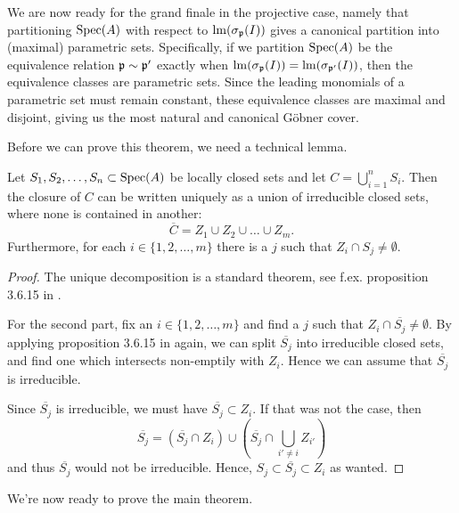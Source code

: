 We are now ready for the grand finale in the projective case, namely that partitioning $\operatorname{Spec}(A)$ with respect to $\operatorname{lm}(\sigma_{\mathfrak p}(I))$ gives a canonical partition into (maximal) parametric sets. Specifically, if we partition $\operatorname{Spec}(A)$ be the equivalence relation $\mathfrak p \sim \mathfrak p'$ exactly when $\operatorname{lm}(\sigma_{\mathfrak p}(I)) = \operatorname{lm}(\sigma_{\mathfrak p'}(I))$, then the equivalence classes are parametric sets. Since the leading monomials of a parametric set must remain constant, these equivalence classes are maximal and disjoint, giving us the most natural and canonical Göbner cover.

Before we can prove this theorem, we need a technical lemma.

\begin{lemma}\label{lem:irred_has_opens}
  Let $S_{1}, S_{2}, \dots, S_{n} \subset \operatorname{Spec}(A)$ be locally closed sets and let $C = \bigcup_{i=1}^{n} S_{i}$. Then the closure of $C$ can be written uniquely as a union of irreducible closed sets, where none is contained in another:
  \[\overline C = Z_{1} \cup Z_{2} \cup \dots \cup Z_{m}.\]
  Furthermore, for each $i \in \{1, 2, \dots, m\}$ there is a $j$ such that $Z_{i} \cap S_{j} \neq \emptyset$.
\end{lemma}
\begin{proof}
  The unique decomposition is a standard theorem, see f.ex. proposition 3.6.15 in \cite{FOAG}.

  For the second part, fix an $i \in \{1, 2, \dots, m\}$ and find a $j$ such that $Z_{i} \cap \overline{S_{j}} \neq \emptyset$. By applying proposition 3.6.15 in \cite{FOAG} again, we can split $\overline{S_{j}}$ into irreducible closed sets, and find one which intersects non-emptily with $Z_{i}$. Hence we can assume that $\overline{S_{j}}$ is irreducible.

  Since $\overline{S_{j}}$ is irreducible, we must have $\overline{S_{j}} \subset Z_{i}$. If that was not the case, then \[\overline{S_{j}} = (\overline{S_{j}} \cap Z_{i}) \cup (\overline{S_{j}} \cap \bigcup_{i' \neq i} Z_{i'})\] and thus $\overline{S_{j}}$ would not be irreducible. Hence, $S_{j} \subset \overline{S_{j}} \subset Z_{i}$ as wanted.
\end{proof}

We're now ready to prove the main theorem.

